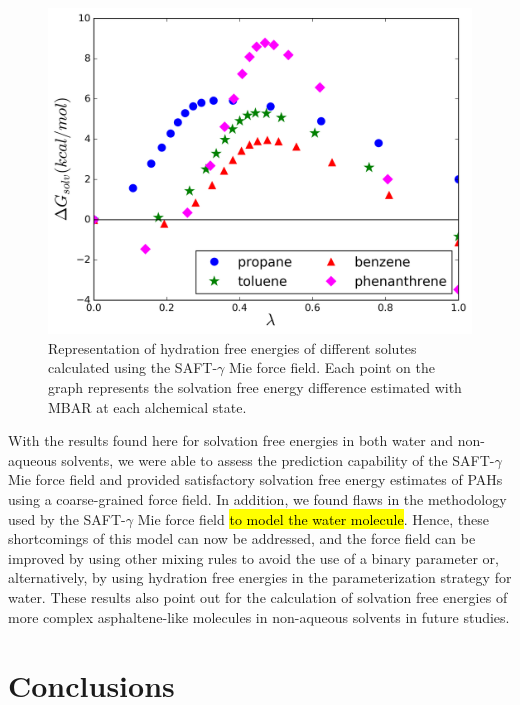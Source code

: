 \documentclass[final,12p,times,twocolumn]{elsarticle}
\begin{document}
	\begin{figure}
		\centering
		\includegraphics[width=1.0\linewidth]{Figures/waterart}
		\caption{Representation of hydration free energies of different solutes calculated using the SAFT-$\gamma$ Mie force field. Each point on the graph represents the solvation free energy difference estimated with MBAR at each alchemical state.}
		\label{fig:water}
	\end{figure}
	
	With the results found here for solvation free energies in both water and non-aqueous solvents, we were able to assess the prediction capability of the SAFT-$\gamma$ Mie force field and provided satisfactory solvation free energy estimates of PAHs using a coarse-grained force field. In addition, we found flaws in the methodology used by the SAFT-$\gamma$ Mie force field \hl{to model the water molecule}.
	Hence, these shortcomings of this model can now be addressed, and the force field can be improved by using other mixing rules to avoid the use of a binary parameter or, alternatively, by using hydration free energies in the parameterization strategy for water. These results also point out for the calculation of solvation free energies of more complex  asphaltene-like molecules in non-aqueous solvents in future studies.
	
	\section{Conclusions}
\end{document}
